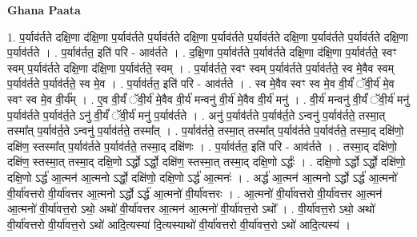 \documentclass[17pt]{extarticle}
\begin{document}
\textbf{Ghana Paata } \newline

1. प॒र्याव॑र्तते दक्षि॒णा द॑क्षि॒णा प॒र्याव॑र्तते प॒र्याव॑र्तते दक्षि॒णा प॒र्याव॑र्तते प॒र्याव॑र्तते दक्षि॒णा प॒र्याव॑र्तते प॒र्याव॑र्तते दक्षि॒णा प॒र्याव॑र्तते । . प॒र्याव॑र्तत॒ इति॑ परि - आव॑र्तते । . द॒क्षि॒णा प॒र्याव॑र्तते प॒र्याव॑र्तते दक्षि॒णा द॑क्षि॒णा प॒र्याव॑र्तते॒ स्वꣳ स्वम् प॒र्याव॑र्तते दक्षि॒णा द॑क्षि॒णा प॒र्याव॑र्तते॒ स्वम् । . प॒र्याव॑र्तते॒ स्वꣳ स्वम् प॒र्याव॑र्तते प॒र्याव॑र्तते॒ स्व मे॒वैव स्वम् प॒र्याव॑र्तते प॒र्याव॑र्तते॒ स्व मे॒व । . प॒र्याव॑र्तत॒ इति॑ परि - आव॑र्तते । . स्व मे॒वैव स्वꣳ स्व मे॒व वी॒र्यं॑ ॅवी॒र्य॑ मे॒व स्वꣳ स्व मे॒व वी॒र्य᳚म् । . ए॒व वी॒र्यं॑ ॅवी॒र्य॑ मे॒वैव वी॒र्य॑ मन्वनु॑ वी॒र्य॑ मे॒वैव वी॒र्य॑ मनु॑ । . वी॒र्य॑ मन्वनु॑ वी॒र्यं॑ ॅवी॒र्य॑ मनु॑ प॒र्याव॑र्तते प॒र्याव॑र्त॒ते ऽनु॑ वी॒र्यं॑ ॅवी॒र्य॑ मनु॑ प॒र्याव॑र्तते । . अनु॑ प॒र्याव॑र्तते प॒र्याव॑र्त॒ते ऽन्वनु॑ प॒र्याव॑र्तते॒ तस्मा॒त् तस्मा᳚त् प॒र्याव॑र्त॒ते ऽन्वनु॑ प॒र्याव॑र्तते॒ तस्मा᳚त् । . प॒र्याव॑र्तते॒ तस्मा॒त् तस्मा᳚त् प॒र्याव॑र्तते प॒र्याव॑र्तते॒ तस्मा॒द् दक्षि॑णो॒ दक्षि॑ण॒ स्तस्मा᳚त् प॒र्याव॑र्तते प॒र्याव॑र्तते॒ तस्मा॒द् दक्षि॑णः । . प॒र्याव॑र्तत॒ इति॑ परि - आव॑र्तते । . तस्मा॒द् दक्षि॑णो॒ दक्षि॑ण॒ स्तस्मा॒त् तस्मा॒द् दक्षि॒णो ऽर्द्धो ऽर्द्धो॒ दक्षि॑ण॒ स्तस्मा॒त् तस्मा॒द् दक्षि॒णो ऽर्द्धः॑ । . दक्षि॒णो ऽर्द्धो ऽर्द्धो॒ दक्षि॑णो॒ दक्षि॒णो ऽर्द्ध॑ आ॒त्मन॑ आ॒त्मनो ऽर्द्धो॒ दक्षि॑णो॒ दक्षि॒णो ऽर्द्ध॑ आ॒त्मनः॑ । . अर्द्ध॑ आ॒त्मन॑ आ॒त्मनो ऽर्द्धो ऽर्द्ध॑ आ॒त्मनो॑ वी॒र्या॑वत्तरो वी॒र्या॑वत्तर आ॒त्मनो ऽर्द्धो ऽर्द्ध॑ आ॒त्मनो॑ वी॒र्या॑वत्तरः । . आ॒त्मनो॑ वी॒र्या॑वत्तरो वी॒र्या॑वत्तर आ॒त्मन॑ आ॒त्मनो॑ वी॒र्या॑वत्त॒रो ऽथो॒ अथो॑ वी॒र्या॑वत्तर आ॒त्मन॑ आ॒त्मनो॑ वी॒र्या॑वत्त॒रो ऽथो᳚ । . वी॒र्या॑वत्त॒रो ऽथो॒ अथो॑ वी॒र्या॑वत्तरो वी॒र्या॑वत्त॒रो ऽथो॑ आदि॒त्यस्या॑ दि॒त्यस्याथो॑ वी॒र्या॑वत्तरो वी॒र्या॑वत्त॒रो ऽथो॑ आदि॒त्यस्य॑ । \newline
\end{document}
